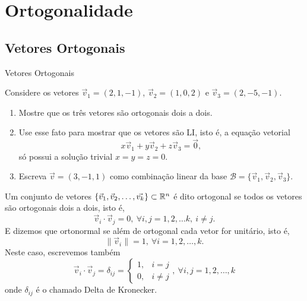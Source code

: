 \section{Ortogonalidade}

\subsection*{Vetores Ortogonais}

\begin{frame}[label=orto]{Vetores Ortogonais}
\begin{exer}
Considere os vetores $\vec{v}_1=(2,1,-1)$, $\vec{v}_2=(1,0,2)$ e $\vec{v}_3=(2,-5,-1)$. 

\begin{enumerate}
\item Mostre que os três vetores são ortogonais dois a dois.

\item Use esse fato para mostrar que os vetores são LI, isto é, a equação vetorial 
\[x\vec{v}_1+y\vec{v}_2+z\vec{v}_3=\vec{0},\]
{\color{red}só possui} a solução trivial $x=y=z=0$.

\item Escreva  $\vec{v}=(3,-1,1)$ como combinação linear da base $\mathcal{B}=\{\vec{v}_1,\vec{v}_2,\vec{v}_3\}$.
\end{enumerate}
\end{exer}

\end{frame}

\begin{frame}[label=orto]{}
\begin{defin}
Um conjunto de vetores $\{\vec{v}_1,\vec{v}_2,\ldots, \vec{v_k}\}\subset \mathbb{R}^n$ é dito {\color{blue}ortogonal} se todos os vetores são ortogonais dois a dois, isto é,
\[\vec{v}_i\cdot \vec{v}_j=0,\ \forall i,j=1,2,\ldots k, \ i\neq j.\]
E dizemos que {\color{blue}ortonormal} se além de ortogonal cada vetor for unitário, isto é, 
\[\|\vec{v}_i\|=1,\ \forall i=1,2,\ldots,k.\]
Neste caso, escrevemos também
\[
\vec{v}_i\cdot \vec{v}_j=\delta_{ij}=
\begin{cases}
1, & i=j\\ 0, & i\neq j
\end{cases}, \ \forall i,j=1,2,\ldots,k
\]
onde $\delta_{ij}$ é o chamado {\color{blue}Delta de Kronecker}.
\end{defin}

\end{frame}

